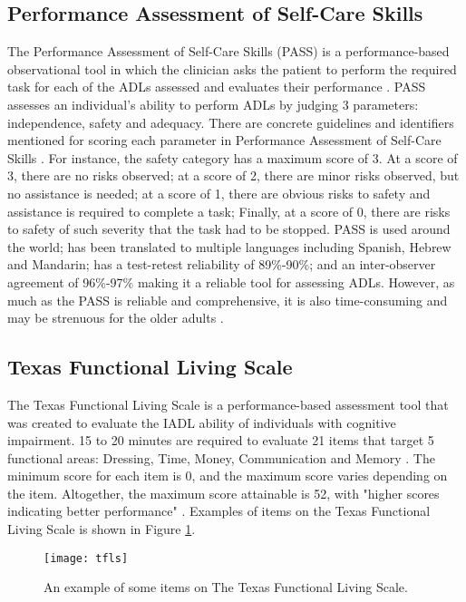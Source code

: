 \subsection{Performance Assessment of Self-Care Skills}
The Performance Assessment of Self-Care Skills (PASS) is a performance-based observational tool in which the clinician asks the patient to perform the required task for each of the ADLs assessed and evaluates their performance \cite{pashmdarfard_assessment_2020}. PASS assesses an individual’s ability to perform ADLs by judging 3 parameters: independence, safety and adequacy. There are concrete guidelines and identifiers mentioned for scoring each parameter in Performance Assessment of Self-Care Skills \cite{rogers_performance_2014}. For instance, the safety category has a maximum score of 3. At a score of 3, there are no risks observed; at a score of 2, there are minor risks observed, but no assistance is needed; at a score of 1, there are obvious risks to safety and assistance is required to complete a task; Finally, at a score of 0, there are risks to safety of such severity that the task had to be stopped. PASS is used around the world; has been translated to multiple languages including Spanish, Hebrew and Mandarin; has a test-retest reliability of 89\%-90\%; and an inter-observer agreement of 96\%-97\% \cite{chisholm_evaluating_2014} making it a reliable tool for assessing ADLs. However, as much as the PASS is reliable and comprehensive, it is also time-consuming and may be strenuous for the older adults \cite{pashmdarfard_assessment_2020}. 


\subsection{Texas Functional Living Scale}
The Texas Functional Living Scale is a performance-based assessment tool that was created to evaluate the IADL ability of individuals with cognitive impairment. 15 to 20 minutes are required to evaluate 21 items that target 5 functional areas: Dressing, Time, Money, Communication and Memory \cite{cullum_performance-based_2001}. The minimum score for each item is 0, and the maximum score varies depending on the item. Altogether, the maximum score attainable is 52, with "higher scores indicating better performance" \cite{cullum_performance-based_2001}. Examples of items on the Texas Functional Living Scale is shown in Figure \ref{fig:tfls}.

\begin{figure}[ht]
    \centering
    \texttt{[image: tfls]}
    \caption{An example of some items on The Texas Functional Living Scale.}
    \label{fig:tfls}
\end{figure}

